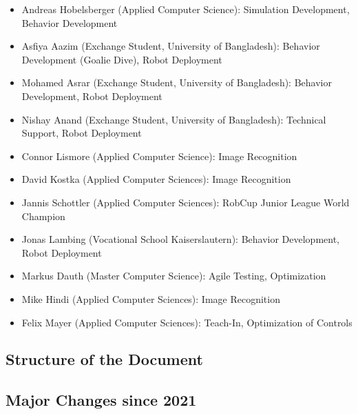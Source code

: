 \begin{itemize}
	\item Andreas Hobelsberger (Applied Computer Science): Simulation Development, Behavior Development
	\item Asfiya Aazim (Exchange Student, University of Bangladesh): Behavior Development (Goalie Dive), Robot Deployment
	\item Mohamed Asrar (Exchange Student, University of Bangladesh): Behavior Development, Robot Deployment
	\item Nishay Anand (Exchange Student, University of Bangladesh): Technical Support, Robot Deployment
	\item Connor Lismore (Applied Computer Science): Image Recognition
	\item David Kostka (Applied Computer Sciences): Image Recognition
	\item Jannis Schottler (Applied Computer Sciences): RobCup Junior League World Champion
	\item Jonas Lambing (Vocational School Kaiserslautern): Behavior Development, Robot Deployment
	\item Markus Dauth (Master Computer Science): Agile Testing, Optimization
	\item Mike Hindi (Applied Computer Sciences): Image Recognition
	\item Felix Mayer (Applied Computer Sciences): Teach-In, Optimization of Controls
\end{itemize}

\subsection{Structure of the Document}

\subsection{Major Changes since 2021}